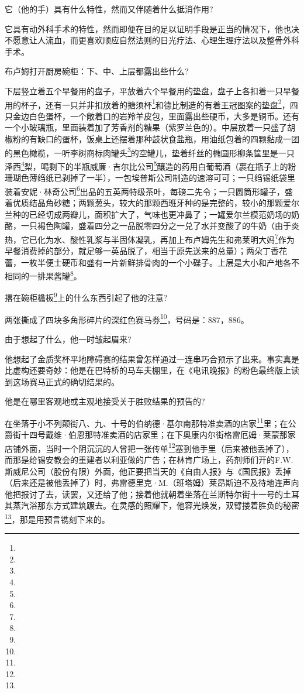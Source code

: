 \par 它（他的手）具有什么特性，然而又伴随着什么抵消作用?
\par 它具有动外科手术的特性，然而即便在目的足以证明手段是正当的情况下，他也决不愿意让人流血，而更喜欢顺应自然法则的日光疗法、心理生理疗法以及整骨外科手术。
\par 布卢姆打开厨房碗柜：下、中、上层都露出些什么?
\par 下层竖立着五个早餐用的盘子，平放着六个早餐用的垫盘，盘子上各扣着一只早餐用的杯子，还有一只并非扣放着的搪须杯\footnote{}和德比制造的有着王冠图案的垫盘\footnote{}，四只金边白色蛋杯，一个敞着口的岩羚羊皮包，里面露出些硬币，大多是铜币。还有一个小玻璃瓶，里面装着加了芳香剂的糖果（紫罗兰色的）。中层放着一只盛了胡椒粉的有缺口的蛋杯，饭桌上还摆着那种鼓状食盐瓶，用油纸包着的四颗黏成一团的黑色橄榄，一听李树商标肉罐头\footnote{}的空罐儿，垫着纤丝的椭圆形柳条筐里是一只泽西\footnote{}梨，喝剩下的半瓶威廉·吉尔比公司\footnote{}釀造的药用白葡萄酒（裹在瓶子上的粉珊瑚色薄绉纸已剥掉了一半），一包埃普斯公司制造的速溶可可；一只绉锡纸袋里装着安妮·林奇公司\footnote{}出品的五英两特级茶叶，每磅二先令；一只圆筒形罐子，盛着优质结晶角砂糖；两颗葱头，较大的那颗西班牙种的是完整的，较小的那颗爱尔兰种的已经切成两瓣儿，面积扩大了，气味也更冲鼻了；一罐爱尔兰模范奶场的奶酪，一只褐色陶罐，盛着四分之一品脱零四分之一兑了水并变酸了的牛奶（由于炎热，它已化为水、酸性乳浆与半固体凝乳，再加上布卢姆先生和弗莱明大妈\footnote{}作为早餐消费掉的部分，就足够一英品脱了，相当于原先送来的总量）；两朵丁香花蕾，一枚半便士硬币和盛有一片新鲜排骨肉的一个小碟子。上层是大小和产地各不相同的一排果酱罐\footnote{}。
\par 撂在碗柜檐板\footnote{}上的什么东西引起了他的注意?
\par 两张撕成了四块多角形碎片的深红色赛马券\footnote{}，号码是：887，886。
\par 由于想起了什么，他一时皱起眉来?
\par 他想起了金质奖杯平地障碍赛的结果曾怎样通过一连串巧合预示了出来。事实真是比虚构还要奇妙：他是在巴特桥的马车夫棚里，在《电讯晚报》的粉色最终版上读到这场赛马正式的确切结果的。
\par 他是在哪里客观地或主观地接受关于胜败结果的预告的?
\par 在坐落于小不列颠街八、九、十号的伯纳德·基尔南那特准卖酒的店家\footnote{}里；在公爵街十四号戴维·伯恩那特准卖酒的店家里；在下奥康内尔街格雷厄姆·莱蒙那家店铺外面，当时一个阴沉沉的人曾把一张传单\footnote{}塞到他手里（后来被他丢掉了），而那是给锡安教会的重建者以利亚做的广告；在林肯广场上，药剂师们开的F.W.斯威尼公司（股份有限）外面，他正要把当天的《自由人报》与《国民报》丢掉（后来还是被他丢掉了）时，弗雷德里克·M.（班塔姆）莱昂斯迫不及待地连声向他把报讨了去，读罢，又还给了他；接着他就朝着坐落在兰斯特尔街十一号的土耳其蒸汽浴那东方式建筑踱去。在灵感的照耀下，他容光焕发，双臂搂着胜负的秘密\footnote{}，那是用预言镌刻下来的。
